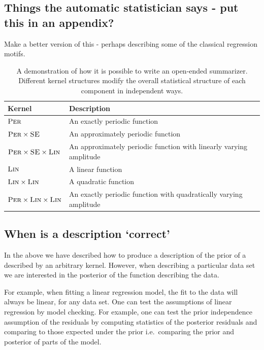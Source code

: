 \documentclass{article}
\def\ie{i.e.\ }
\begin{document}
\subsection{Things the automatic statistician says - put this in an appendix?}
\label{sec:example_translation}

Make a better version of this - perhaps describing some of the classical regression motifs.

\begin{table}[ht]
\begin{tabular}{l|l}
Kernel & Description \\
\midrule
${\textsc{Per}}$ & An exactly periodic function \\
${\textsc{Per}} \times {\textsc{SE}}$ & An approximately periodic function \\
${\textsc{Per}} \times {\textsc{SE}} \times {\textsc{Lin}}$ & An approximately periodic function with linearly varying amplitude \\
${\textsc{Lin}}$ & A linear function \\
${\textsc{Lin}} \times {\textsc{Lin}}$ & A quadratic function \\
${\textsc{Per}} \times {\textsc{Lin}} \times {\textsc{Lin}}$ & An exactly periodic function with quadratically varying amplitude\\
\end{tabular}
\caption{A demonstration of how it is possible to write an open-ended summarizer.  Different kernel structures modify the overall statistical structure of each component in independent ways.}
\label{table:descriptions}
\end{table}

\subsection{When is a description `correct'}

In the above we have described how to produce a description of the prior of a \gp{} described by an arbitrary kernel.
However, when describing a particular data set we are interested in the posterior of the function describing the data.

For example, when fitting a linear regression model, the fit to the data will always be linear, for any data set.
One can test the assumptions of linear regression by model checking.
For example, one can test the prior independence assumption of the residuals by computing statistics of the posterior residuals and comparing to those expected under the prior \ie comparing the prior and posterior of parts of the model.
\end{document}
